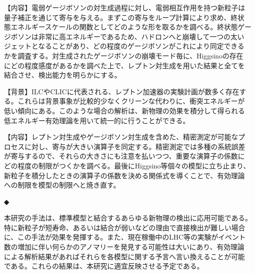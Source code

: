 \documentclass[11pt,a4paper,twoside,dvipdfmx]{jarticle}		%
\newcommand{\研究課題名}{粒子加速器を用いた電弱相互作用を持つ新物理の探索}
\newcommand{\研究機関名}{東京大学}
\newcommand{\申請者氏名}{千草颯}
\newcommand{\研究代表者氏名}{\申請者氏名}
\newcommand{\研究期間の最終元号年度}{34}	%
\begin{document}
{【内容】電弱ゲージボソンの対生成過程に対し、電弱相互作用を持つ新粒子は
量子補正を通じて寄与を与える。まずこの寄与をループ計算により求め、終状
態エネルギースケールの関数としてどのような形を取るかを調べる。終状態ゲー
ジボソンは非常に高エネルギーであるため、ハドロンへと崩壊して一つの太い
ジェットとなることがあり、どの程度のゲージボソンがこれにより同定できる
かを調査する。対生成されたゲージボソンの崩壊モード毎に、Higgsinoの存在
にどの程度感度があるかを調べた上で、レプトン対生成を用いた結果と全てを
結合させ、検出能力を明らかにする。

\vspace*{1mm}


\vspace*{1mm}

【背景】ILCやCLICに代表される、レプトン加速器の実験計画が数多く存在す
る。これらは背景事象が比較的少なくクリーンな代わりに、衝突エネルギーが
低い傾向にある。このような場合の解析は、新物理の効果を積分して得られる
低エネルギー有効理論を用いて統一的に行うことができる。

【内容】レプトン対生成やゲージボソン対生成を含めた、精密測定が可能なプ
ロセスに対し、寄与が大きい演算子を同定する。精密測定では多種の系統誤差
が寄与するので、それらの大きさにも注意を払いつつ、重要な演算子の係数に
どの程度の制限がつくかを調べる。最後にHiggsino等個々の模型に立ち止まり、
新粒子を積分したときの演算子の係数を決める関係式を導くことで、有効理論
への制限を模型の制限へと焼き直す。

\vspace*{1mm}

◆ 

\vspace*{1mm}

本研究の手法は、標準模型と結合するあらゆる新物理の検出に応用可能である。
特に新粒子が短寿命、あるいは結合が弱いなどの理由で直接検出が難しい場合
に、この手法が効果を発揮する。また、現在稼働中のLHC等の実験がイベント
数の増加に伴い何らかのアノマリーを発見する可能性は大いにあり、有効理論
による解析結果があればそれらを各模型に関する予言へ言い換えることが可能
である。これらの結果は、本研究に適宜反映させる予定である。

\vspace*{1mm}


}

\end{document}
